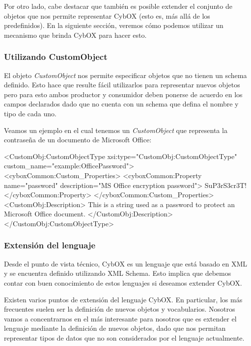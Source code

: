 Por otro lado, cabe destacar que también es posible extender el conjunto de objetos que nos permite representar CybOX (esto es, más allá de los predefinidos). En la siguiente sección, veremos cómo podemos utilizar un mecanismo que brinda CybOX para hacer esto.

\subsubsection{Utilizando CustomObject}
El objeto \emph{CustomObject} nos permite especificar objetos que no tienen un schema definido. Esto hace que resulte fácil utilizarlos para representar nuevos objetos pero para esto ambos productor y consumidor deben ponerse de acuerdo en los campos declarados dado que no cuenta con un schema que defina el nombre y tipo de cada uno.

Veamos un ejemplo en el cual tenemos un \emph{CustomObject} \cite{customObject} que representa la contraseña de un documento de Microsoft Office:
\newline

\begin{xml}
<CustomObj:CustomObjectType xsi:type="CustomObj:CustomObjectType" custom_name="example:OfficePassword">
  <cyboxCommon:Custom_Properties>
    <cyboxCommon:Property name="password" 
    description="MS Office encryption password">
      SuP3rS3cr3T!
    </cyboxCommon:Property>
  </cyboxCommon:Custom_Properties>
    <CustomObj:Description>
      This is a string used as a password to protect an Microsoft Office document.
    </CustomObj:Description>
</CustomObj:CustomObjectType>
\end{xml}

\subsubsection{Extensión del lenguaje}
\label{extensionDelLenguaje}
Desde el punto de vista técnico, CybOX es un lenguaje que está basado en XML y se encuentra definido utilizando XML Schema. Esto implica que debemos contar con buen conocimiento de estos lenguajes si deseamos extender CybOX.

Existen varios puntos de extensión del lenguaje CybOX. En particular, los más frecuentes suelen ser la definición de nuevos objetos y vocabularios. Nosotros vamos a concentrarnos en el más interesante para nosotros que es extender el lenguaje mediante la definición de nuevos objetos, dado que nos permitan representar tipos de datos que no son considerados por el lenguaje actualmente.

